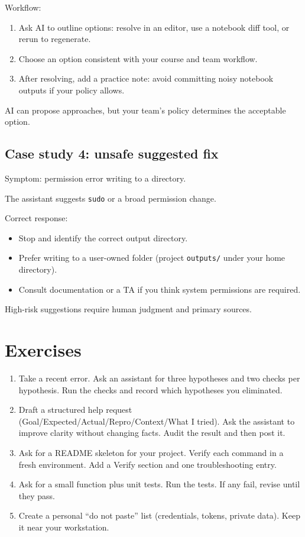 Workflow:
\begin{enumerate}[noitemsep]
  \item Ask AI to outline options: resolve in an editor, use a notebook diff tool, or rerun to regenerate.
  \item Choose an option consistent with your course and team workflow.
  \item After resolving, add a practice note: avoid committing noisy notebook outputs if your policy allows.
\end{enumerate}

AI can propose approaches, but your team's policy determines the acceptable option.

\subsection{Case study 4: unsafe suggested fix}
Symptom: permission error writing to a directory.

The assistant suggests \texttt{sudo} or a broad permission change.

Correct response:
\begin{itemize}[noitemsep]
  \item Stop and identify the correct output directory.
  \item Prefer writing to a user-owned folder (project \texttt{outputs/} under your home directory).
  \item Consult documentation or a TA if you think system permissions are required.
\end{itemize}

High-risk suggestions require human judgment and primary sources.

\section{Exercises}
\begin{enumerate}[noitemsep]
  \item Take a recent error. Ask an assistant for three hypotheses and two checks per hypothesis. Run the checks and record which hypotheses you eliminated.
  \item Draft a structured help request (Goal/Expected/Actual/Repro/Context/What I tried). Ask the assistant to improve clarity without changing facts. Audit the result and then post it.
  \item Ask for a README skeleton for your project. Verify each command in a fresh environment. Add a Verify section and one troubleshooting entry.
  \item Ask for a small function plus unit tests. Run the tests. If any fail, revise until they pass.
  \item Create a personal ``do not paste'' list (credentials, tokens, private data). Keep it near your workstation.
\end{enumerate}

